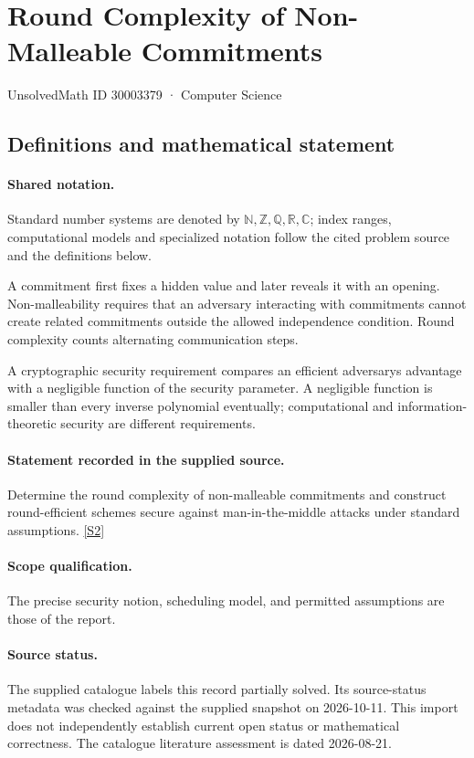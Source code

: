 \documentclass[11pt]{article}
\newcommand{\sref}[2]{\hyperlink{source:#1:#2}{[S#2]}}
\begin{document}
\setcounter{section}{30003378}
\section{Round Complexity of Non-Malleable Commitments}\label{30003379}
{\small\sffamily UnsolvedMath ID 30003379 · Computer Science}
\subsection{Definitions and mathematical statement}

\paragraph{Shared notation.}Standard number systems are denoted by $\mathbb N,\mathbb Z,\mathbb Q,\mathbb R,\mathbb C$; index ranges, computational models and specialized notation follow the cited problem source and the definitions below.


A commitment first fixes a hidden value and later reveals it with an opening. Non-malleability requires that an adversary interacting with commitments cannot create related commitments outside the allowed independence condition. Round complexity counts alternating communication steps.

A cryptographic security requirement compares an efficient adversary\textquotesingle s advantage with a negligible function of the security parameter. A negligible function is smaller than every inverse polynomial eventually; computational and information-theoretic security are different requirements.
\paragraph{Statement recorded in the supplied source.}
Determine the round complexity of non-malleable commitments and construct round-efficient schemes secure against man-in-the-middle attacks under standard assumptions. \sref{30003379}{2}
\paragraph{Scope qualification.}
The precise security notion, scheduling model, and permitted assumptions are those of the report.
\paragraph{Source status.}
The supplied catalogue labels this record partially solved. Its source-status metadata was checked against the supplied snapshot on 2026-10-11. This import does not independently establish current open status or mathematical correctness. The catalogue literature assessment is dated 2026-08-21.
\end{document}
